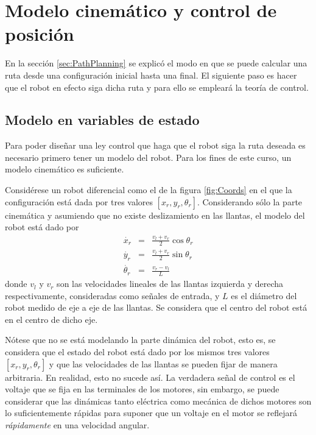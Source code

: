 \documentclass[letterpaper,12pt]{article}
\begin{document}
\section{Modelo cinemático y control de posición}
En la sección \ref{sec:PathPlanning} se explicó el modo en que se puede calcular una ruta desde una configuración inicial hasta una final. El siguiente paso es hacer que el robot en efecto siga dicha ruta y para ello se empleará la teoría de control. 

\subsection{Modelo en variables de estado}
Para poder diseñar una ley control que haga que el robot siga la ruta deseada es necesario primero tener un modelo del robot. Para los fines de este curso, un modelo cinemático es suficiente. 

Considérese un robot diferencial como el de la figura \ref{fig:Coords} en el que la configuración está dada por tres valores $\left[x_r, y_r, \theta_r\right]$. Considerando sólo la parte cinemática y asumiendo que no existe deslizamiento en las llantas, el modelo del robot está dado por
\begin{eqnarray}                                                                                                                        
\dot{x_r} &=& \frac{v_l + v_r}{2}\cos\theta_r\label{eq:Kinematic1}\\                                                                        
\dot{y_r} &=& \frac{v_l + v_r}{2}\sin\theta_r\\                                                                                             
\dot{\theta_r} &=& \frac{v_r - v_l}{L}\label{eq:Kinematic3}                                                                               
\end{eqnarray}
donde $v_l$ y $v_r$ son las velocidades lineales de las llantas izquierda y derecha respectivamente, consideradas como señales de entrada, y $L$ es el diámetro del robot medido de eje a eje de las llantas. Se considera que el centro del robot está en el centro de dicho eje.

Nótese que no se está modelando la parte dinámica del robot, esto es, se considera que el estado del robot está dado por los mismos tres valores $\left[x_r, y_r, \theta_r\right]$ y que las velocidades de las llantas se pueden fijar de manera arbitraria. En realidad, esto no sucede así. La verdadera señal de control es el voltaje que se fija en las terminales de los motores, sin embargo, se puede considerar que las dinámicas tanto eléctrica como mecánica de dichos motores son lo suficientemente rápidas para suponer que un voltaje en el motor se reflejará \textit{rápidamente} en una velocidad angular.
\end{document}
